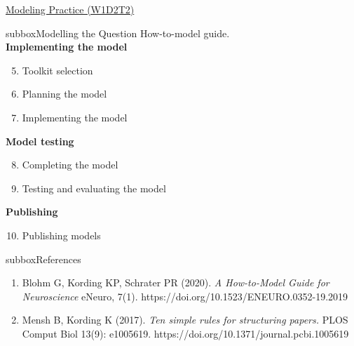 \begin{textbox}{\href{https://compneuro.neuromatch.io/tutorials/W1D2_ModelingPractice/W1D2_Intro.html}{Modeling Practice (W1D2T2)} }
\begin{subbox}{subbox}{Modelling the Question}
\scriptsize
How-to-model guide. \\
\textbf{Implementing the model}
\begin{enumerate}
  \setcounter{enumi}{4}
    \item  Toolkit selection
   \item  Planning the model
   \item  Implementing the model
   \end{enumerate}
\textbf{Model testing}
  
\begin{enumerate}
  \setcounter{enumi}{7}
\item Completing the model
\item Testing and evaluating the model
\end{enumerate}
\textbf{Publishing}

\begin{enumerate}
  \setcounter{enumi}{9}
\item Publishing models

\end{enumerate}

\end{subbox}
\begin{subbox}{subbox}{References}
\scriptsize

\begin{enumerate}
 \item  Blohm G, Kording KP, Schrater PR (2020). \textit{A How-to-Model Guide for Neuroscience} eNeuro, 7(1). https://doi.org/10.1523/ENEURO.0352-19.2019 

\item Mensh B, Kording K (2017). \textit{Ten simple rules for structuring papers.} PLOS Comput Biol 13(9): e1005619. https://doi.org/10.1371/journal.pcbi.1005619


\end{enumerate}

\end{subbox}
\end{textbox}
